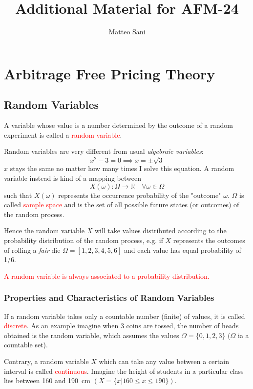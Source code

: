 \documentclass[12pt,a4paper]{book}
\title{Additional Material for AFM-24}
\author{Matteo Sani}
\begin{document}
\maketitle
\chapter{Arbitrage Free Pricing Theory}
\section{Random Variables}
A variable whose value is a number determined by the outcome of a random experiment is called a \textcolor{red}{random variable}.

Random variables are very different from usual \emph{algebraic variables}:
\begin{equation*}
x^2 - 3 = 0 \implies x = \pm \sqrt{3}
\end{equation*}	
$x$ stays the same no matter how many times I solve this equation.
A random variable instead is kind of a mapping between 
\begin{equation*}
X(\omega):\Omega\rightarrow \mathbb{R}\quad \forall\omega\in\Omega
\end{equation*}
such that $X(\omega)$ represents the occurrence probability of the "outcome" $\omega$. $\Omega$ is called \textcolor{red}{sample space} and is the set of all possible future states (or outcomes) of the random process.
	
Hence the random variable $X$ will take values distributed according to the probability distribution of the random process, e.g. if $X$ represents the outcomes of rolling a \emph{fair} die $\Omega = [1,2,3,4,5,6]$ and each value has equal probability of 1/6.

\textcolor{red}{A random variable is always associated to a probability distribution.}

\subsection{Properties and Characteristics of Random Variables}		

If a random variable takes only a countable number (finite) of values, it is called \textcolor{red}{discrete}. As an example imagine when 3 coins are tossed, the number of heads obtained is the random variable, which assumes the values $\Omega=\{0,1,2,3\}$ ($\Omega$ ia a countable set).

Contrary, a random variable $X$ which can take any value between a certain interval is called \textcolor{red}{continuous}. Imagine the height of students in a particular class lies between 160 and 190~cm $(X = \{x|160 \leq x \leq 190\})$.
\end{document}
